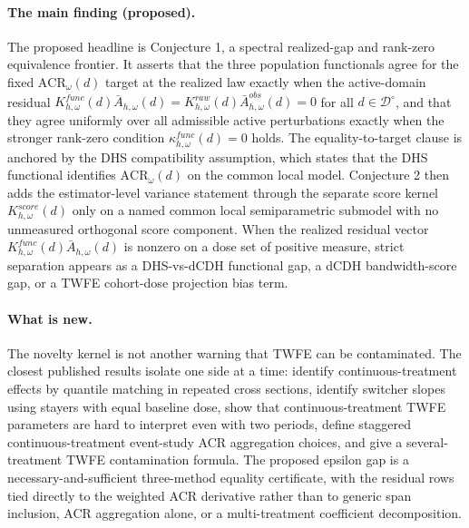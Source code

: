 \documentclass[11pt]{article}
\theoremstyle{definition}
\theoremstyle{plain}
\theoremstyle{remark}
\begin{document}
\paragraph{The main finding (proposed).}
The proposed headline is Conjecture 1, a spectral realized-gap and rank-zero equivalence frontier. It asserts that the three population functionals agree for the fixed \(\mathrm{ACR}_\omega(d)\) target at the realized law exactly when the active-domain residual \(K^{func}_{h,\omega}(d)\bar A_{h,\omega}(d)=K^{raw}_{h,\omega}(d)\bar A^{obs}_{h,\omega}(d)=0\) for all \(d \in \mathcal D^\circ\), and that they agree uniformly over all admissible active perturbations exactly when the stronger rank-zero condition \(\kappa^{func}_{h,\omega}(d)=0\) holds. The equality-to-target clause is anchored by the DHS compatibility assumption, which states that the DHS functional identifies \(\mathrm{ACR}_\omega(d)\) on the common local model. Conjecture 2 then adds the estimator-level variance statement through the separate score kernel \(K^{score}_{h,\omega}(d)\) only on a named common local semiparametric submodel with no unmeasured orthogonal score component. When the realized residual vector \(K^{func}_{h,\omega}(d)\bar A_{h,\omega}(d)\) is nonzero on a dose set of positive measure, strict separation appears as a DHS-vs-dCDH functional gap, a dCDH bandwidth-score gap, or a TWFE cohort-dose projection bias term.

\paragraph{What is new.}
The novelty kernel is not another warning that TWFE can be contaminated. The closest published results isolate one side at a time: \citet{DHaultfoeuilleHoderleinSasaki2023} identify continuous-treatment effects by quantile matching in repeated cross sections, \citet{deChaisemartinDHaultfoeuillePasquierSowVazquezBare2025} identify switcher slopes using stayers with equal baseline dose, \citet{CallawayGoodmanBaconSantAnna2024} show that continuous-treatment TWFE parameters are hard to interpret even with two periods, \citet{CallawayGoodmanBaconSantAnna2024EventStudies} define staggered continuous-treatment event-study ACR aggregation choices, and \citet{deChaisemartinDHaultfoeuille2023SeveralTreatments} give a several-treatment TWFE contamination formula. The proposed epsilon gap is a necessary-and-sufficient three-method equality certificate, with the residual rows tied directly to the weighted ACR derivative rather than to generic span inclusion, ACR aggregation alone, or a multi-treatment coefficient decomposition.
\end{document}
